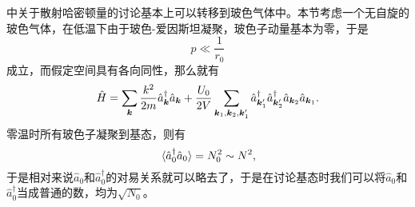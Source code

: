 \documentclass[hyperref, UTF8, a4paper]{ctexart}
\begin{document}
中关于散射哈密顿量的讨论基本上可以转移到玻色气体中。本节考虑一个无自旋的玻色气体，在低温下由于玻色-爱因斯坦凝聚，玻色子动量基本为零，于是
\[
    p \ll \frac{1}{r_0}
\]
成立，而假定空间具有各向同性，那么就有
\begin{equation}
    \hat{H} = \sum_{\vb*{k}} \frac{k^2}{2m} \hat{a}^\dagger_{\vb*{k}} \hat{a}_{\vb*{k}} + \frac{U_0}{2V} \sum_{\vb*{k}_1, \vb*{k}_2, \vb*{k}_1'} \hat{a}^\dagger_{\vb*{k}_1'} \hat{a}^\dagger_{\vb*{k}_2'} \hat{a}_{\vb*{k}_2} \hat{a}_{\vb*{k}_1}.
    \label{eq:boson-gas-weak-int}
\end{equation}
零温时所有玻色子凝聚到基态，则有
\[
    \expval*{\hat{a}^\dagger_0 \hat{a}_0} = N_0^2 \sim N^2,
\]
于是相对来说$\hat{a}_0$和$\hat{a}^\dagger_0$的对易关系就可以略去了，于是在讨论基态时我们可以将$\hat{a}_0$和$\hat{a}^\dagger_0$当成普通的数，均为$\sqrt{N_0}$。
\end{document}
